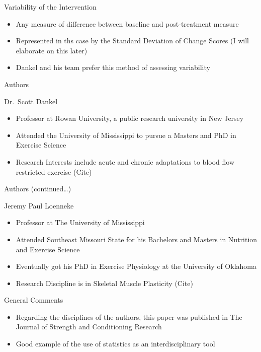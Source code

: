 \documentclass[
  ignorenonframetext,
  aspectratio=169,
]{beamer}
\providecommand{\tightlist}{%
  \setlength{\itemsep}{0pt}\setlength{\parskip}{0pt}}
\begin{document}
\begin{frame}{Variability of the Intervention}
\protect\hypertarget{variability-of-the-intervention}{}
\begin{itemize}
\tightlist
\item
  Any measure of difference between baseline and post-treatment measure
\item
  Represented in ths case by the Standard Deviation of Change Scores (I
  will elaborate on this later)
\item
  Dankel and his team prefer this method of assessing variability
\end{itemize}
\end{frame}

\begin{frame}{Authors}
\protect\hypertarget{authors}{}
\begin{block}{Dr.~Scott Dankel}
\protect\hypertarget{dr.-scott-dankel}{}
\begin{itemize}
\tightlist
\item
  Professor at Rowan University, a public research university in New
  Jersey
\item
  Attended the University of Mississippi to pursue a Masters and PhD in
  Exercise Science
\item
  Research Interests include acute and chronic adaptations to blood flow
  restricted exercise (Cite)
\end{itemize}
\end{block}
\end{frame}

\begin{frame}{Authors (continued\ldots)}
\protect\hypertarget{authors-continued}{}
\begin{block}{Jeremy Paul Loenneke}
\protect\hypertarget{jeremy-paul-loenneke}{}
\begin{itemize}
\tightlist
\item
  Professor at The University of Mississippi
\item
  Attended Southeast Missouri State for his Bachelors and Masters in
  Nutrition and Exercise Science
\item
  Eventually got his PhD in Exercise Physiology at the University of
  Oklahoma
\item
  Research Discipline is in Skeletal Muscle Plasticity (Cite)
\end{itemize}
\end{block}

\begin{block}{General Comments}
\protect\hypertarget{general-comments}{}
\begin{itemize}
\tightlist
\item
  Regarding the disciplines of the authors, this paper was published in
  The Journal of Strength and Conditioning Research
\item
  Good example of the use of statistics as an interdisciplinary tool
\end{itemize}
\end{block}
\end{frame}
\end{document}
